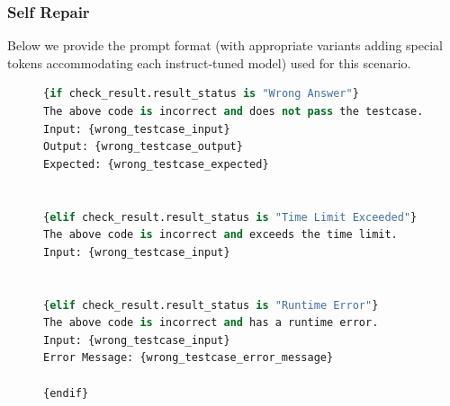     
\subsubsection{Self Repair}
\label{appendix:repair-prompts}
Below we provide the prompt format (with appropriate variants adding special tokens accommodating each instruct-tuned model) used for this scenario.

\begin{figure}[h!]
\centering
\begin{tcolorbox}[enhanced,size=small,colback=black!5!white,colframe=RoyalBlue,flip title={interior hidden},title={Self Repair Error Feedback Pseudocode}]
\begin{lstlisting}[label={lst:execution-example-filtered-1}, captionpos=b, breaklines=true, language=Python]
{if check_result.result_status is "Wrong Answer"}
The above code is incorrect and does not pass the testcase.
Input: {wrong_testcase_input}
Output: {wrong_testcase_output}
Expected: {wrong_testcase_expected}


{elif check_result.result_status is "Time Limit Exceeded"}
The above code is incorrect and exceeds the time limit.
Input: {wrong_testcase_input}


{elif check_result.result_status is "Runtime Error"}
The above code is incorrect and has a runtime error.
Input: {wrong_testcase_input}
Error Message: {wrong_testcase_error_message}

{endif}
\end{lstlisting}
\end{tcolorbox}
\end{figure}

